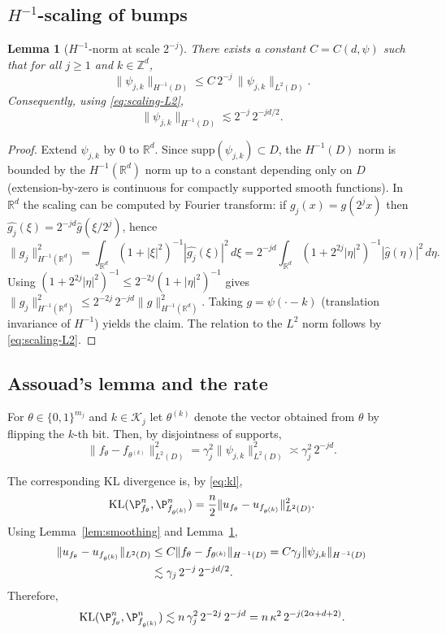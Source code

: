 \documentclass[11pt]{article}
\newtheorem{lemma}{Lemma}
\theoremstyle{definition}
\theoremstyle{remark}
\newcommand{\R}{\mathbb{R}}
\newcommand{\1}{\mathbf{1}}
\begin{document}
\subsection{$H^{-1}$-scaling of bumps}

\begin{lemma}[$H^{-1}$-norm at scale $2^{-j}$]\label{lem:H-1scaling}
There exists a constant $C=C(d,\psi)$ such that for all $j\ge1$ and $k\in\mathbb Z^d$,
\[
\|\psi_{j,k}\|_{H^{-1}(D)} \le C\,2^{-j}\,\|\psi_{j,k}\|_{L^2(D)}.
\]
Consequently, using \eqref{eq:scaling-L2},
\[
\|\psi_{j,k}\|_{H^{-1}(D)} \lesssim 2^{-j}\,2^{-jd/2}.
\]
\end{lemma}

\begin{proof}
Extend $\psi_{j,k}$ by $0$ to $\R^d$. Since $\mathrm{supp}(\psi_{j,k})\subset D$, the $H^{-1}(D)$ norm is bounded by the $H^{-1}(\R^d)$ norm up to a constant depending only on $D$ (extension-by-zero is continuous for compactly supported smooth functions). In $\R^d$ the scaling can be computed by Fourier transform: if $g_j(x)=g(2^j x)$ then $\widehat{g_j}(\xi)=2^{-jd}\hat g(\xi/2^j)$, hence
\[
\|g_j\|_{H^{-1}(\R^d)}^2
=\int_{\R^d}(1+|\xi|^2)^{-1}|\widehat{g_j}(\xi)|^2\,d\xi
=2^{-jd}\int_{\R^d}(1+2^{2j}|\eta|^2)^{-1}|\hat g(\eta)|^2\,d\eta.
\]
Using $(1+2^{2j}|\eta|^2)^{-1}\le 2^{-2j}(1+|\eta|^2)^{-1}$ gives
\(
\|g_j\|_{H^{-1}(\R^d)}^2 \le 2^{-2j}\,2^{-jd}\|g\|_{H^{-1}(\R^d)}^2.
\)
Taking $g=\psi(\cdot-k)$ (translation invariance of $H^{-1}$) yields the claim. The relation to the $L^2$ norm follows by \eqref{eq:scaling-L2}.
\end{proof}

\subsection{Assouad's lemma and the rate}

For $\theta\in\{0,1\}^{m_j}$ and $k\in\mathcal K_j$ let $\theta^{(k)}$ denote the vector obtained from $\theta$ by flipping the $k$-th bit. Then, by disjointness of supports,
\begin{equation}\label{eq:L2-distance-neighbour}
\|f_\theta-f_{\theta^{(k)}}\|_{L^2(D)}^2
=\gamma_j^2\|\psi_{j,k}\|_{L^2(D)}^2
\asymp \gamma_j^2\,2^{-jd}.
\end{equation}

The corresponding KL divergence is, by \eqref{eq:kl},
\[
\mathrm{KL}(\P_{f_\theta}^n,\P_{f_{\theta^{(k)}}}^n)
=\frac n2\|u_{f_\theta}-u_{f_{\theta^{(k)}}}\|_{L^2(D)}^2.
\]
Using Lemma~\ref{lem:smoothing} and Lemma~\ref{lem:H-1scaling},
\begin{align}
\|u_{f_\theta}-u_{f_{\theta^{(k)}}}\|_{L^2(D)}
&\le C \|f_\theta-f_{\theta^{(k)}}\|_{H^{-1}(D)}
= C\gamma_j \|\psi_{j,k}\|_{H^{-1}(D)}\notag\\
&\lesssim \gamma_j\,2^{-j}\,2^{-jd/2}.
\label{eq:u-distance}
\end{align}
Therefore,
\begin{equation}\label{eq:KL-bound}
\mathrm{KL}(\P_{f_\theta}^n,\P_{f_{\theta^{(k)}}}^n)
\lesssim n\,\gamma_j^2\,2^{-2j}\,2^{-jd}
= n\,\kappa^2\,2^{-j(2\alpha+d+2)}.
\end{equation}
\end{document}
